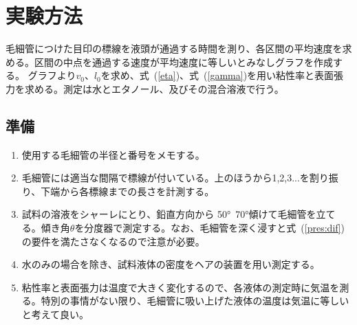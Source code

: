 \documentclass[a4j,10pt]{jarticle}
\newcommand{\Equref}[1]{式~(\ref{#1})}
\begin{document}
\section{実験方法}
毛細管につけた目印の標線を液頭が通過する時間を測り、各区間の平均速度を求める。区間の中点を通過する速度が平均速度に等しいとみなしグラフを作成する。
グラフより$v_0$、$l_0$を求め、\Equref{eta}、\Equref{gamma}を用い粘性率と表面張力を求める。測定は水とエタノール、及びその混合溶液で行う。
\subsection{準備}
\begin{enumerate}
\item 使用する毛細管の半径と番号をメモする。
\item 毛細管には適当な間隔で標線が付いている。上のほうから1,2,3...を割り振り、下端から各標線までの長さを計測する。
\item 試料の溶液をシャーレにとり、鉛直方向から 50°~70°傾けて毛細管を立てる。傾き角$\theta$を分度器で測定する。なお、毛細管を深く浸すと\Equref{pres:dif}の要件を満たさなくなるので注意が必要。
\item 水のみの場合を除き、試料液体の密度をヘアの装置を用い測定する。
\item 粘性率と表面張力は温度で大きく変化するので、各液体の測定時に気温を測る。特別の事情がない限り、毛細管に吸い上げた液体の温度は気温に等しいと考えて良い。
\end{enumerate}
\end{document}
